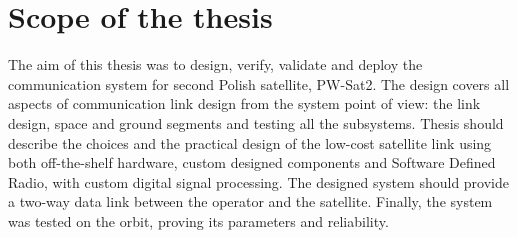 \section{Scope of the thesis}
The aim of this thesis was to design, verify, validate and deploy the communication system for second Polish satellite, PW-Sat2. The design covers all aspects of communication link design from the system point of view: the link design, space and ground segments and testing all the subsystems. Thesis should describe the choices and the practical design of the low-cost satellite link using both off-the-shelf hardware, custom designed components and Software Defined Radio, with custom digital signal processing. The designed system should provide a two-way data link between the operator and the satellite. Finally, the system was tested on the orbit, proving its parameters and reliability.
